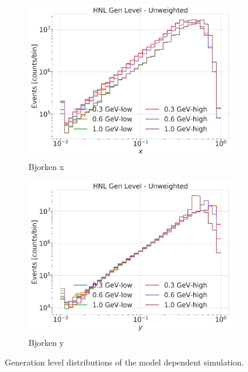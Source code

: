 \begin{figure}[h]
    \centering
    \begin{subfigure}{0.49\linewidth}
        \includegraphics{figures/hnl_simulation/generation/1_d_distr_finalStateX_gen_level_unweighted.png}
        \caption{Bjorken x}
    \end{subfigure}
    \begin{subfigure}{0.49\linewidth}
    \includegraphics{figures/hnl_simulation/generation/1_d_distr_finalStateY_gen_level_unweighted.png}
        \caption{Bjorken y}
    \end{subfigure}
    \caption[Model dependent simulation generation level distributions]{Generation level distributions of the model dependent simulation.}
\end{figure}


